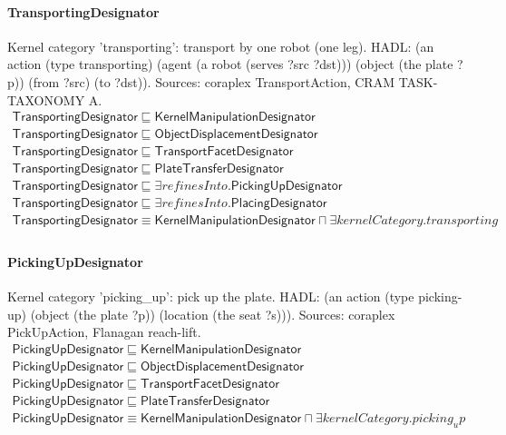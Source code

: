 \documentclass[10pt]{article}
\begin{document}
\paragraph{TransportingDesignator} Kernel category 'transporting': transport by one robot (one leg). HADL: (an action (type transporting) (agent (a robot (serves ?src ?dst))) (object (the plate ?p)) (from ?src) (to ?dst)). Sources: coraplex TransportAction, CRAM TASK-TAXONOMY A.
\[\begin{array}{l}
\mathsf{TransportingDesignator} \sqsubseteq  \mathsf{KernelManipulationDesignator} \\
\mathsf{TransportingDesignator} \sqsubseteq  \mathsf{ObjectDisplacementDesignator} \\
\mathsf{TransportingDesignator} \sqsubseteq  \mathsf{TransportFacetDesignator} \\
\mathsf{TransportingDesignator} \sqsubseteq  \mathsf{PlateTransferDesignator} \\
\mathsf{TransportingDesignator} \sqsubseteq  \exists \mathit{refinesInto}.\mathsf{PickingUpDesignator} \\
\mathsf{TransportingDesignator} \sqsubseteq  \exists \mathit{refinesInto}.\mathsf{PlacingDesignator} \\
\mathsf{TransportingDesignator} \equiv  \mathsf{KernelManipulationDesignator} \sqcap  \exists \mathit{kernelCategory}.{transporting} \\
\end{array}\]
\paragraph{PickingUpDesignator} Kernel category 'picking\_up': pick up the plate. HADL: (an action (type picking-up) (object (the plate ?p)) (location (the seat ?s))). Sources: coraplex PickUpAction, Flanagan reach-lift.
\[\begin{array}{l}
\mathsf{PickingUpDesignator} \sqsubseteq  \mathsf{KernelManipulationDesignator} \\
\mathsf{PickingUpDesignator} \sqsubseteq  \mathsf{ObjectDisplacementDesignator} \\
\mathsf{PickingUpDesignator} \sqsubseteq  \mathsf{TransportFacetDesignator} \\
\mathsf{PickingUpDesignator} \sqsubseteq  \mathsf{PlateTransferDesignator} \\
\mathsf{PickingUpDesignator} \equiv  \mathsf{KernelManipulationDesignator} \sqcap  \exists \mathit{kernelCategory}.{picking_up} \\
\end{array}\]
\end{document}
